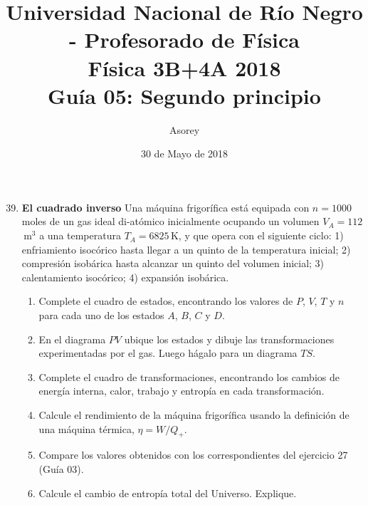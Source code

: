 \documentclass[a4paper,12pt]{article}
\begin{document}
\title{
{\normalsize{Universidad Nacional de Río Negro - Profesorado de Física}}\\
Física 3B+4A  2018 \\ Guía 05: Segundo principio
}
\author{Asorey}
\date{30 de Mayo de 2018} 
\maketitle

\begin{enumerate}
	\setcounter{enumi}{38}      %
    \item {\bf{El cuadrado inverso}}
		Una máquina frigorífica está equipada con $n=1000$\,moles de un gas
		ideal di-atómico inicialmente ocupando un volumen $V_A=112$\,m$^3$ a una
		temperatura $T_A=6825$\,K, y que opera con el siguiente ciclo: 1)
		enfriamiento isocórico hasta llegar a un quinto de la temperatura
		inicial; 2) compresión isobárica hasta alcanzar un quinto del volumen
		inicial; 3) calentamiento isocórico; 4) expansión isobárica.
        \begin{enumerate}
            \item Complete el cuadro de estados, encontrando los valores de
                $P$, $V$, $T$ y $n$ para cada uno de los estados $A$, $B$, $C$
                y $D$.
            \item En el diagrama $PV$ ubique los estados y dibuje las
				transformaciones experimentadas por el gas. Luego hágalo para
				un diagrama $TS$.
            \item Complete el cuadro de transformaciones, encontrando los
                cambios de energía interna, calor, trabajo y entropía en cada
                transformación.
			\item Calcule el rendimiento de la máquina frigorífica usando la
				definición de una máquina térmica, $\eta=W/Q_{+}$.
			\item Compare los valores obtenidos con los correspondientes del
				ejercicio 27 (Guía 03).
			\item Calcule el cambio de entropía total del Universo. Explique.
        \end{enumerate}


\end{enumerate}
\end{document}
